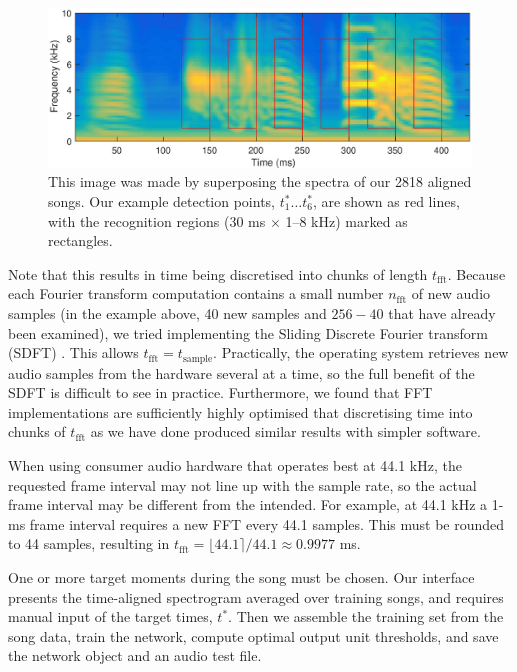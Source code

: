 \documentclass[10pt,letterpaper]{article}
\begin{document}
\begin{figure}
  \includegraphics[width=\textwidth]{Fig1}
  \caption{This image was made by superposing the spectra of our 2818
    aligned songs.  Our example detection points, $t^*_1\ldots t^*_6$,
    are shown as red lines, with the recognition regions (30 ms
    $\times$ 1--8 kHz) marked as rectangles.}
  \label{fig:song}
\end{figure}



Note that this results in time being discretised into chunks of length
$t_\mathrm{fft}$.  Because each Fourier transform computation contains
a small number $n_\mathrm{fft}$ of new audio samples (in the example
above, 40 new samples and $256-40$ that have already been examined),
we tried implementing the Sliding Discrete Fourier transform (SDFT)
\cite{Jacobsen2003SlidingDFT}.  This allows
$t_\textrm{fft}=t_\textrm{sample}$.  Practically, the operating system
retrieves new audio samples from the hardware several at a time, so
the full benefit of the SDFT is difficult to see in practice.
Furthermore, we found that FFT implementations are sufficiently highly
optimised that discretising time into chunks of $t_\mathrm{fft}$ as we
have done produced similar results with simpler software.

When using consumer audio hardware that operates best at 44.1 kHz, the
requested frame interval may not line up with the sample rate, so the
actual frame interval may be different from the intended.  For
example, at 44.1 kHz a 1-ms frame interval requires a new FFT every
44.1 samples.  This must be rounded to 44 samples, resulting in
$t_\textrm{fft}=\lfloor 44.1 \rceil / 44.1 \approx 0.9977$ ms.

One or more target moments during the song must be chosen.  Our
interface presents the time-aligned spectrogram averaged over training
songs, and requires manual input of the target times, $t^*$.  Then we
assemble the training set from the song data, train the network,
compute optimal output unit thresholds, and save the network object
and an audio test file.
\end{document}

